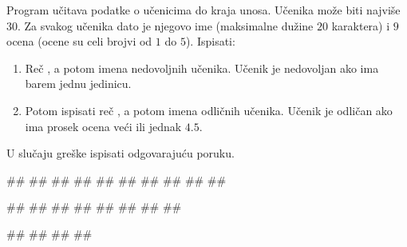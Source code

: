 \begin{Exercise}[label=struc.14]
Program učitava podatke o učenicima do kraja unosa. Učenika može biti
najviše $30$.  Za svakog učenika dato je njegovo ime (maksimalne
dužine $20$ karaktera) i $9$ ocena (ocene su celi brojvi od $1$ do
$5$).  Ispisati:
\begin{enumerate}
\item Reč , a potom imena nedovoljnih učenika.
  Učenik je nedovoljan ako ima barem jednu jedinicu.
\item Potom ispisati reč , a potom imena odličnih
  učenika.  Učenik je odličan ako ima prosek ocena veći ili jednak
  $4.5$.
\end{enumerate}
U slučaju greške ispisati odgovarajuću poruku.

\begin{maxitest}
\begin{upotreba}{1}
#\naslovInt#
##
##
##
##
##
##
#\izlaz{\ }#
##
##
\end{upotreba}
\end{maxitest}

\begin{maxitest}
\begin{upotreba}{2}
#\naslovInt#
##
##
##
##
#\izlaz{\ }#
##
##
\end{upotreba}
\end{maxitest}

\begin{maxitest}
\begin{upotreba}{3}
#\naslovInt#
##
##
##
\end{upotreba}
\end{maxitest}

\end{Exercise}
\begin{Answer}[ref=struc.14]
\end{Answer}

